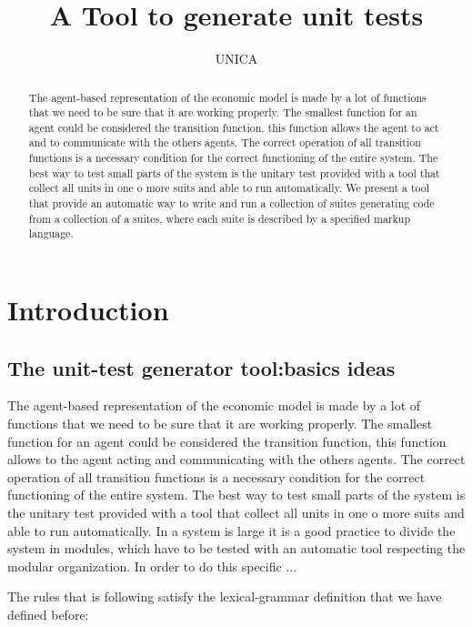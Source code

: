 \documentclass[a4paper,10pt]{article}
\title{A Tool to generate unit tests }
\author{UNICA}
\begin{document}
\maketitle



\begin{abstract}  
The agent-based representation of the economic model is made by a lot of functions that we need to be sure that it are working properly. The smallest function for an agent could be considered the transition function, this function allows the agent to act and to communicate with the others agents. The correct operation of all transition functions  is a necessary condition for the correct functioning of the entire system.
The best way to test small parts of the system is the unitary test provided with a tool that collect all units in one o more suits and able to run automatically. We present a tool that provide an automatic way to write and run a collection of suites generating code from a collection of a suites, where each suite is described by a specified markup language.
\end{abstract}
\tableofcontents

\section{Introduction}

\subsection{The unit-test generator tool:basics ideas}

The agent-based representation of the economic model is made by a lot of functions that we need to be sure that it are working properly. The smallest function for an agent could be considered the transition function, this function allows to the agent acting and communicating with the others agents. The correct operation of all transition functions is a necessary condition for the correct functioning of the entire system.
The best way to test small parts of the system is the unitary test provided with a tool that collect all units in one o more suits and able to run automatically. In a system is large it is a good practice to divide the system in modules, which have to be tested with an automatic tool respecting the modular organization. In order to do this specific ... 

%
The rules that is following satisfy the lexical-grammar definition that we have defined before:

\end{document}

